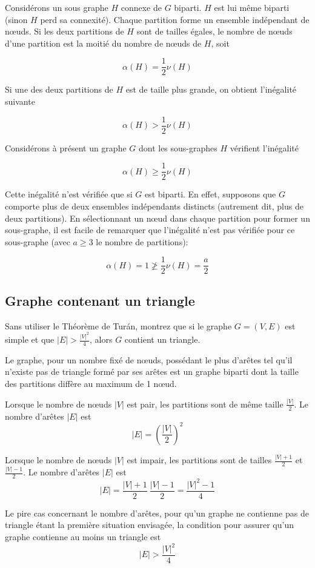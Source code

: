 \begin{solution}
Considérons un sous graphe $H$ connexe de $G$ biparti. $H$ est lui même biparti (sinon $H$ perd sa connexité).
Chaque partition forme un ensemble indépendant de nœuds. Si les deux partitions de $H$ sont de tailles égales, le nombre de nœuds d'une partition est la moitié du nombre de nœuds de $H$, soit

$$\alpha(H)=\frac{1}{2}\nu(H)$$

Si une des deux partitions de $H$ est de taille plus grande, on obtient l'inégalité suivante

$$\alpha(H)>\frac{1}{2}\nu(H)$$

Considérons à présent un graphe $G$ dont les sous-graphes $H$ vérifient l'inégalité

$$\alpha(H)\geqslant\frac{1}{2}\nu(H)$$

Cette inégalité n'est vérifiée que si $G$ est biparti. En effet, supposons que $G$ comporte plus de deux ensembles indépendants distincts (autrement dit, plus de deux partitions). En sélectionnant un nœud dans chaque partition pour former un sous-graphe, il est facile de remarquer que l'inégalité n'est pas vérifiée pour ce sous-graphe (avec $a\geqslant3$ le nombre de partitions):

$$\alpha(H)=1\ngeqslant\frac{1}{2}\nu(H)=\frac{a}{2}$$
\end{solution}

\subsection{Graphe contenant un triangle}
Sans utiliser le Théorème de Turán, montrez que si le graphe $G = (V, E)$ est simple et que $|E| > \frac{|V|^2}{4}$, alors $G$ contient un triangle.

\begin{solution}
Le graphe, pour un nombre fixé de nœuds, possédant le plus d'arêtes tel qu'il n'existe pas de triangle formé par ses arêtes est un graphe biparti dont la taille des partitions diffère au maximum de 1 nœud.

Lorsque le nombre de nœuds $|V|$ est pair, les partitions sont de même taille $\frac{|V|}{2}$. Le nombre d'arêtes $|E|$ est $$|E|=\left(\frac{|V|}{2}\right)^2$$

Lorsque le nombre de nœuds $|V|$ est impair, les partitions sont de tailles $\frac{|V|+1}{2}$ et $\frac{|V|-1}{2}$. Le nombre d'arêtes $|E|$ est $$|E|=\frac{|V|+1}{2}~\frac{|V|-1}{2}=\frac{|V|^2-1}{4}$$

Le pire cas concernant le nombre d'arêtes, pour qu'un graphe ne contienne pas de triangle étant la première situation envisagée, la condition pour assurer qu'un graphe contienne au moins un triangle est $$|E|>\frac{|V|^2}{4}$$
\end{solution}
